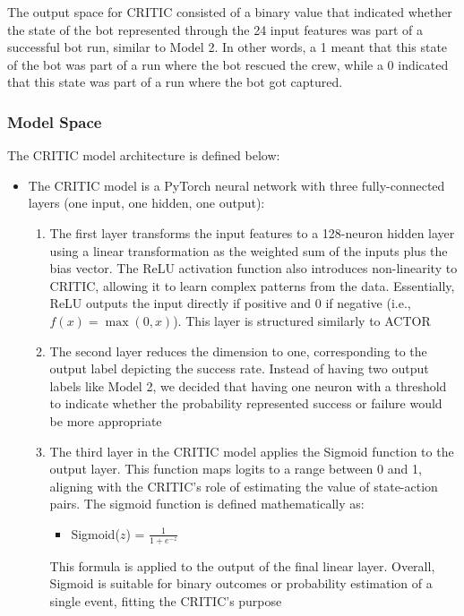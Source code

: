 \documentclass[11pt]{article}
\begin{document}
The output space for CRITIC consisted of a binary value that indicated whether the state of the bot represented through the 24 input features was part of a successful bot run, similar to Model 2. In other words, a 1 meant that this state of the bot was part of a run where the bot rescued the crew, while a 0 indicated that this state was part of a run where the bot got captured.

\subsubsection{Model Space}

The CRITIC model architecture is defined below:

\begin{itemize}
    \item The CRITIC model is a PyTorch neural network with three fully-connected layers (one input, one hidden, one output):
    \begin{enumerate}
        \item The first layer transforms the input features to a 128-neuron hidden layer using a linear transformation as the weighted sum of the inputs plus the bias vector. The ReLU activation function also introduces non-linearity to CRITIC, allowing it to learn complex patterns from the data. Essentially, ReLU outputs the input directly if positive and 0 if negative (i.e., $f(x) = \max(0, x)$). This layer is structured similarly to ACTOR
        \item The second layer reduces the dimension to one, corresponding to the output label depicting the success rate. Instead of having two output labels like Model 2, we decided that having one neuron with a threshold to indicate whether the probability represented success or failure would be more appropriate
        \item The third layer in the CRITIC model applies the Sigmoid function to the output layer. This function maps logits to a range between 0 and 1, aligning with the CRITIC's role of estimating the value of state-action pairs. The sigmoid function is defined mathematically as:
        \begin{itemize}
            \item Sigmoid($z$) = $\frac{1}{1 + e^{-z}}$
        \end{itemize}
        This formula is applied to the output of the final linear layer. Overall, Sigmoid is suitable for binary outcomes or probability estimation of a single event, fitting the CRITIC's purpose
    \end{enumerate}
\end{itemize}
\end{document}

